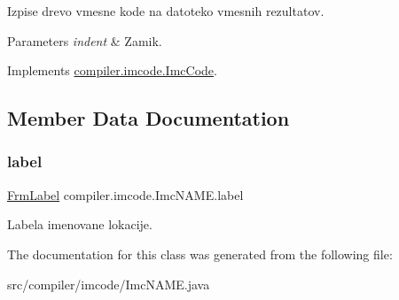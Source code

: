 Izpise drevo vmesne kode na datoteko vmesnih rezultatov.


\begin{DoxyParams}{Parameters}
{\em indent} & Zamik. \\
\hline
\end{DoxyParams}


Implements \hyperlink{interfacecompiler_1_1imcode_1_1_imc_code_a26451dea2ab4dbd7054ac33f4c6d71fe}{compiler.\+imcode.\+Imc\+Code}.



\subsection{Member Data Documentation}
\mbox{\label{classcompiler_1_1imcode_1_1_imc_n_a_m_e_a9f002a6e62a2da786fc8242a6e85f909}} 
\subsubsection{\texorpdfstring{label}{label}}
{\footnotesize\ttfamily \hyperlink{classcompiler_1_1frames_1_1_frm_label}{Frm\+Label} compiler.\+imcode.\+Imc\+N\+A\+M\+E.\+label}

Labela imenovane lokacije. 

The documentation for this class was generated from the following file\+:\begin{DoxyCompactItemize}
\item 
src/compiler/imcode/Imc\+N\+A\+M\+E.\+java\end{DoxyCompactItemize}
